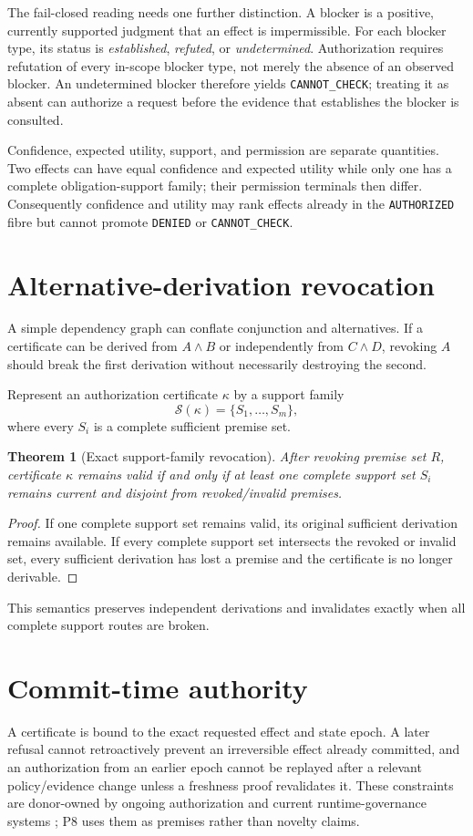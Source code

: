 \documentclass[11pt]{article}
\newtheorem{theorem}{Theorem}
\begin{document}
The fail-closed reading needs one further distinction. A blocker is a positive,
currently supported judgment that an effect is impermissible. For each blocker
type, its status is \emph{established}, \emph{refuted}, or \emph{undetermined}.
Authorization requires refutation of every in-scope blocker type, not merely the
absence of an observed blocker. An undetermined blocker therefore yields
\texttt{CANNOT\_CHECK}; treating it as absent can authorize a request before the
evidence that establishes the blocker is consulted.

Confidence, expected utility, support, and permission are separate quantities.
Two effects can have equal confidence and expected utility while only one has a
complete obligation-support family; their permission terminals then differ.
Consequently confidence and utility may rank effects already in the
\texttt{AUTHORIZED} fibre but cannot promote \texttt{DENIED} or
\texttt{CANNOT\_CHECK}.

\section{Alternative-derivation revocation}
A simple dependency graph can conflate conjunction and alternatives. If a certificate can be derived from $A\wedge B$ or independently from $C\wedge D$, revoking $A$ should break the first derivation without necessarily destroying the second.

Represent an authorization certificate $\kappa$ by a support family
\[
\mathcal S(\kappa)=\{S_1,\ldots,S_m\},
\]
where every $S_i$ is a complete sufficient premise set.

\begin{theorem}[Exact support-family revocation]
After revoking premise set $R$, certificate $\kappa$ remains valid if and only if at least one complete support set $S_i$ remains current and disjoint from revoked/invalid premises.
\end{theorem}
\begin{proof}
If one complete support set remains valid, its original sufficient derivation remains available. If every complete support set intersects the revoked or invalid set, every sufficient derivation has lost a premise and the certificate is no longer derivable.
\end{proof}

This semantics preserves independent derivations and invalidates exactly when all complete support routes are broken.

\section{Commit-time authority}
A certificate is bound to the exact requested effect and state epoch. A later refusal cannot retroactively prevent an irreversible effect already committed, and an authorization from an earlier epoch cannot be replayed after a relevant policy/evidence change unless a freshness proof revalidates it. These constraints are donor-owned by ongoing authorization and current runtime-governance systems \cite{ucon2004,sagefin2026}; P8 uses them as premises rather than novelty claims.
\end{document}
